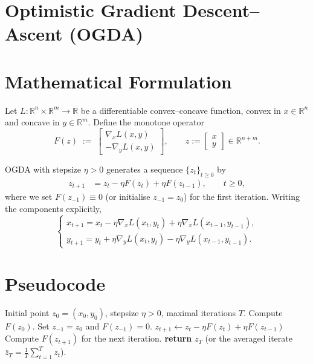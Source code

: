 \documentclass{article}
\newcommand{\R}{\mathbb{R}}
\begin{document}
\section*{Optimistic Gradient Descent--Ascent (OGDA)}

\section*{Mathematical Formulation}
Let $L:\R^{n}\times\R^{m}\rightarrow\R$ be a differentiable convex--concave function,
convex in $x\in\R^{n}$ and concave in $y\in\R^{m}$.  
Define the monotone operator
\[
F(z)\;:=\;
\begin{bmatrix}
\nabla_{x}L(x,y)\\[2mm]
-\nabla_{y}L(x,y)
\end{bmatrix},
\qquad 
z:=\begin{bmatrix}x\\y\end{bmatrix}\in\R^{n+m}.
\]

OGDA with stepsize $\eta>0$ generates a sequence $\{z_{t}\}_{t\ge 0}$ by
\begin{align}
z_{t+1}&=z_{t}-\eta F(z_{t})+\eta F(z_{t-1}),\qquad t\ge 0,
\label{eq:update}
\end{align}
where we set $F(z_{-1})\equiv 0$ (or initialise $z_{-1}=z_{0}$) for the first iteration.
Writing the components explicitly,
\[
\begin{cases}
x_{t+1}=x_{t}-\eta\nabla_{x}L(x_{t},y_{t})+\eta\nabla_{x}L(x_{t-1},y_{t-1}),\\[1mm]
y_{t+1}=y_{t}+\eta\nabla_{y}L(x_{t},y_{t})-\eta\nabla_{y}L(x_{t-1},y_{t-1}).
\end{cases}
\tag{OGDA}
\]

\section*{Pseudocode}
\begin{algorithm}[H]
\caption{Optimistic Gradient Descent--Ascent}
\begin{algorithmic}[1]
\Require Initial point $z_{0}=(x_{0},y_{0})$, stepsize $\eta>0$, maximal iterations $T$.
\State Compute $F(z_{0})$.
\State Set $z_{-1}=z_{0}$ and $F(z_{-1})=0$.
    \State $z_{t+1}\gets z_{t}-\eta F(z_{t})+\eta F(z_{t-1})$ 
    \State Compute $F(z_{t+1})$ for the next iteration.
\EndFor
\State \textbf{return} $z_{T}$ (or the averaged iterate $\bar z_T=\frac1T\sum_{t=1}^{T}z_t$).
\end{algorithmic}
\end{algorithm}
\end{document}
